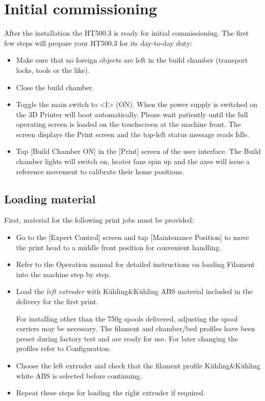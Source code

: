 \section{Initial commissioning}

After the installation the HT500.3 is ready for initial commissioning. The first few steps will prepare your HT500.3 for its day-to-day duty:

\begin{itemize}
  \item Make sure that no foreign objects are left in the build chamber 
        (transport locks, tools or the like).
  \item Close the build chamber.
  \item Toggle the main switch to <I> (ON).
        When the power supply is switched on the 3D Printer will boot automatically. Please wait patiently until the full operating screen is loaded on the touchscreen at the machine front. The screen displays the Print screen and the top-left status message reads Idle.
  \item Tap [Build Chamber ON] in the [Print] screen of the user interface. The Build chamber lights will switch on, heater fans
        spin up and the axes will issue a reference movement to calibrate their home positions.
\end{itemize}


\subsection{Loading material}

First, material for the following print jobs must be provided:

\begin{itemize}
  \item Go to the [Expert Control] screen and tap [Maintenance Position] to move the print head to a middle front position for convenient handling.
  \item Refer to the Operation manual for detailed instructions on loading Filament into the machine step by step.
  \item Load the \emph{left extruder} with Kühling\&Kühling ABS material included 
        in the delivery for the first print.

  \begin{info}
    For installing other than the 750g spools delivered, adjusting the spool carriers may be necessary.
    The filament and chamber/bed profiles have been preset during factory test and are ready for use. For later changing the profiles refer to Configuration.
  \end{info}

  \item Choose the left extruder and check that the filament profile Kühling\&Kühling 
        white ABS is selected before continuing.
  \item Repeat these steps for loading the right extruder if required.
\end{itemize}


